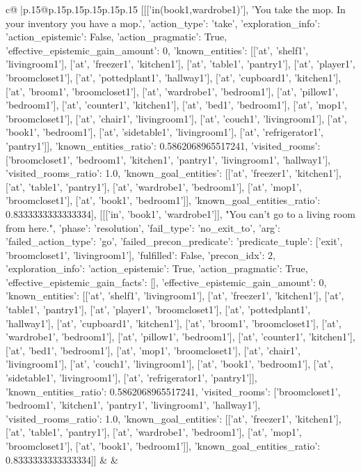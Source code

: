 \documentclass{article}
\begin{document}
{\begin{supertabular}{c@{$\;$}|p{.15\linewidth}@{}p{.15\linewidth}p{.15\linewidth}p{.15\linewidth}p{.15\linewidth}p{.15\linewidth}}
{{{	 [[['in(book1,wardrobe1)'], 'You take the mop. In your inventory you have a mop.', {'action_type': 'take', 'exploration_info': {'action_epistemic': False, 'action_pragmatic': True, 'effective_epistemic_gain_amount': 0, 'known_entities': [['at', 'shelf1', 'livingroom1'], ['at', 'freezer1', 'kitchen1'], ['at', 'table1', 'pantry1'], ['at', 'player1', 'broomcloset1'], ['at', 'pottedplant1', 'hallway1'], ['at', 'cupboard1', 'kitchen1'], ['at', 'broom1', 'broomcloset1'], ['at', 'wardrobe1', 'bedroom1'], ['at', 'pillow1', 'bedroom1'], ['at', 'counter1', 'kitchen1'], ['at', 'bed1', 'bedroom1'], ['at', 'mop1', 'broomcloset1'], ['at', 'chair1', 'livingroom1'], ['at', 'couch1', 'livingroom1'], ['at', 'book1', 'bedroom1'], ['at', 'sidetable1', 'livingroom1'], ['at', 'refrigerator1', 'pantry1']], 'known_entities_ratio': 0.5862068965517241, 'visited_rooms': ['broomcloset1', 'bedroom1', 'kitchen1', 'pantry1', 'livingroom1', 'hallway1'], 'visited_rooms_ratio': 1.0, 'known_goal_entities': [['at', 'freezer1', 'kitchen1'], ['at', 'table1', 'pantry1'], ['at', 'wardrobe1', 'bedroom1'], ['at', 'mop1', 'broomcloset1'], ['at', 'book1', 'bedroom1']], 'known_goal_entities_ratio': 0.8333333333333334}}], [[['in', 'book1', 'wardrobe1']], "You can't go to a living room from here.", {'phase': 'resolution', 'fail_type': 'no_exit_to', 'arg': {'failed_action_type': 'go', 'failed_precon_predicate': {'predicate_tuple': ['exit', 'broomcloset1', 'livingroom1'], 'fulfilled': False, 'precon_idx': 2}}, 'exploration_info': {'action_epistemic': True, 'action_pragmatic': True, 'effective_epistemic_gain_facts': [], 'effective_epistemic_gain_amount': 0, 'known_entities': [['at', 'shelf1', 'livingroom1'], ['at', 'freezer1', 'kitchen1'], ['at', 'table1', 'pantry1'], ['at', 'player1', 'broomcloset1'], ['at', 'pottedplant1', 'hallway1'], ['at', 'cupboard1', 'kitchen1'], ['at', 'broom1', 'broomcloset1'], ['at', 'wardrobe1', 'bedroom1'], ['at', 'pillow1', 'bedroom1'], ['at', 'counter1', 'kitchen1'], ['at', 'bed1', 'bedroom1'], ['at', 'mop1', 'broomcloset1'], ['at', 'chair1', 'livingroom1'], ['at', 'couch1', 'livingroom1'], ['at', 'book1', 'bedroom1'], ['at', 'sidetable1', 'livingroom1'], ['at', 'refrigerator1', 'pantry1']], 'known_entities_ratio': 0.5862068965517241, 'visited_rooms': ['broomcloset1', 'bedroom1', 'kitchen1', 'pantry1', 'livingroom1', 'hallway1'], 'visited_rooms_ratio': 1.0, 'known_goal_entities': [['at', 'freezer1', 'kitchen1'], ['at', 'table1', 'pantry1'], ['at', 'wardrobe1', 'bedroom1'], ['at', 'mop1', 'broomcloset1'], ['at', 'book1', 'bedroom1']], 'known_goal_entities_ratio': 0.8333333333333334}}]] 
	  } 
	   } 
	   } 
	 & & \\ 
 


\end{supertabular}}
\end{document}
